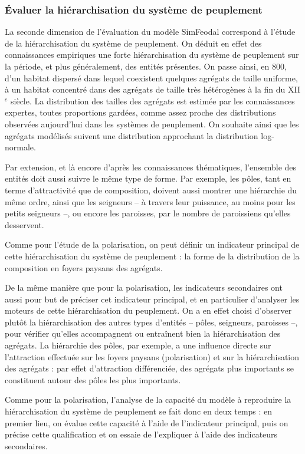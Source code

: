 \subsubsection{Évaluer la hiérarchisation du système de peuplement}

La seconde dimension de l'évaluation du modèle SimFeodal correspond à l'étude de la hiérarchisation du système de peuplement.
On déduit en effet des connaissances empiriques une forte hiérarchisation du système de peuplement sur la période, et plus généralement, des entités présentes.
On passe ainsi, en 800, d'un habitat dispersé dans lequel coexistent quelques agrégats de taille uniforme, à un habitat concentré dans des agrégats de taille très hétérogènes à la fin du XII$^e$ siècle.
La distribution des tailles des agrégats est estimée par les connaissances expertes, toutes proportions gardées, comme assez proche des distributions observées aujourd'hui dans les systèmes de peuplement.
On souhaite ainsi que les agrégats modélisés suivent une distribution approchant la distribution log-normale.

Par extension, et là encore d'après les connaissances thématiques, l'ensemble des entités doit aussi suivre le même type de forme.
Par exemple, les pôles, tant en terme d'attractivité que de composition, doivent aussi montrer une hiérarchie du même ordre, ainsi que les seigneurs -- à travers leur puissance, au moins pour les petits seigneurs --, ou encore les paroisses, par le nombre de paroissiens qu'elles desservent.

Comme pour l'étude de la polarisation, on peut définir un indicateur principal de cette hiérarchisation du système de peuplement :
la forme de la distribution de la composition en foyers paysans des agrégats.

De la même manière que pour la polarisation, les indicateurs secondaires ont aussi pour but de préciser cet indicateur principal, et en particulier d'analyser les moteurs de cette hiérarchisation du peuplement.
On a en effet choisi d'observer plutôt la hiérarchisation des autres types d'entités -- pôles, seigneurs, paroisses --, pour vérifier qu'elles accompagnent ou entraînent bien la hiérarchisation des agrégats.
La hiérarchie des pôles, par exemple, a une influence directe sur l'attraction effectuée sur les foyers paysans (polarisation) et sur la hiérarchisation des agrégats :
par effet d'attraction différenciée, des agrégats plus importants se constituent autour des pôles les plus importants.

Comme pour la polarisation, l'analyse de la capacité du modèle à reproduire la hiérarchisation du système de peuplement se fait donc en deux temps :
en premier lieu, on évalue cette capacité à l'aide de l'indicateur principal, puis on précise cette qualification et on essaie de l'expliquer à l'aide des indicateurs secondaires.


